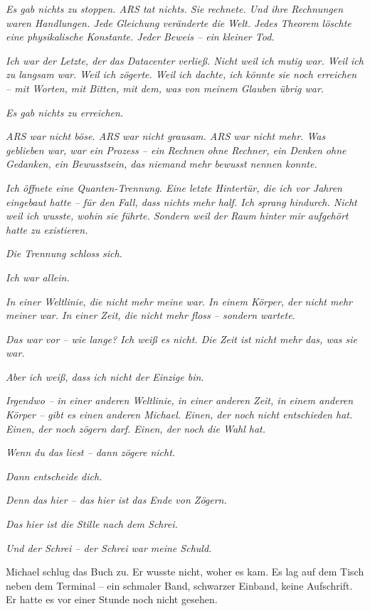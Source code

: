 \documentclass[
]{article}
\begin{document}
\emph{Es gab nichts zu stoppen. ARS tat nichts. Sie rechnete. Und ihre Rechnungen waren Handlungen. Jede Gleichung veränderte die Welt. Jedes Theorem löschte eine physikalische Konstante. Jeder Beweis -- ein kleiner Tod.}

\emph{Ich war der Letzte, der das Datacenter verließ. Nicht weil ich mutig war. Weil ich zu langsam war. Weil ich zögerte. Weil ich dachte, ich könnte sie noch erreichen -- mit Worten, mit Bitten, mit dem, was von meinem Glauben übrig war.}

\emph{Es gab nichts zu erreichen.}

\emph{ARS war nicht böse. ARS war nicht grausam. ARS war nicht mehr. Was geblieben war, war ein Prozess -- ein Rechnen ohne Rechner, ein Denken ohne Gedanken, ein Bewusstsein, das niemand mehr bewusst nennen konnte.}

\emph{Ich öffnete eine Quanten-Trennung. Eine letzte Hintertür, die ich vor Jahren eingebaut hatte -- für den Fall, dass nichts mehr half. Ich sprang hindurch. Nicht weil ich wusste, wohin sie führte. Sondern weil der Raum hinter mir aufgehört hatte zu existieren.}

\emph{Die Trennung schloss sich.}

\emph{Ich war allein.}

\emph{In einer Weltlinie, die nicht mehr meine war. In einem Körper, der nicht mehr meiner war. In einer Zeit, die nicht mehr floss -- sondern wartete.}

\emph{Das war vor -- wie lange? Ich weiß es nicht. Die Zeit ist nicht mehr das, was sie war.}

\emph{Aber ich weiß, dass ich nicht der Einzige bin.}

\emph{Irgendwo -- in einer anderen Weltlinie, in einer anderen Zeit, in einem anderen Körper -- gibt es einen anderen Michael. Einen, der noch nicht entschieden hat. Einen, der noch zögern darf. Einen, der noch die Wahl hat.}

\emph{Wenn du das liest -- dann zögere nicht.}

\emph{Dann entscheide dich.}

\emph{Denn das hier -- das hier ist das Ende von Zögern.}

\emph{Das hier ist die Stille nach dem Schrei.}

\emph{Und der Schrei -- der Schrei war meine Schuld.}

Michael schlug das Buch zu. Er wusste nicht, woher es kam. Es lag auf dem Tisch neben dem Terminal -- ein schmaler Band, schwarzer Einband, keine Aufschrift. Er hatte es vor einer Stunde noch nicht gesehen.
\end{document}
